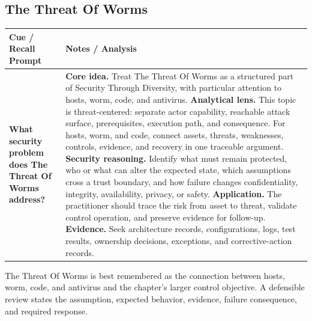 \documentclass[11pt]{article}
\newcommand{\CornellHeader}{%
\rowcolor{Navy}\color{white}\bfseries Cue / Recall Prompt & \color{white}\bfseries Notes / Analysis\\\hline}
\newcommand{\CornellRow}[2]{%
\cellcolor{CueGray}\RaggedRight\textbf{#1} & \RaggedRight #2\\\hline}
\begin{document}
\subsection*{The Threat Of Worms}
\begin{longtable}{>{\RaggedRight\arraybackslash}p{}|>{\RaggedRight\arraybackslash}p{}}
\CornellHeader
\CornellRow{What security problem does The Threat Of Worms address?}{\textbf{Core idea.} Treat The Threat Of Worms as a structured part of Security Through Diversity, with particular attention to hosts, worm, code, and antivirus. \textbf{Analytical lens.} This topic is threat-centered: separate actor capability, reachable attack surface, prerequisites, execution path, and consequence. For hosts, worm, and code, connect assets, threats, weaknesses, controls, evidence, and recovery in one traceable argument. \textbf{Security reasoning.} Identify what must remain protected, who or what can alter the expected state, which assumptions cross a trust boundary, and how failure changes confidentiality, integrity, availability, privacy, or safety. \textbf{Application.} The practitioner should trace the risk from asset to threat, validate control operation, and preserve evidence for follow-up. \textbf{Evidence.} Seek architecture records, configurations, logs, test results, ownership decisions, exceptions, and corrective-action records.}
\end{longtable}
\begin{topicsummary}
The Threat Of Worms is best remembered as the connection between hosts, worm, code, and antivirus and the chapter's larger control objective. A defensible review states the assumption, expected behavior, evidence, failure consequence, and required response.
\end{topicsummary}
\end{document}
